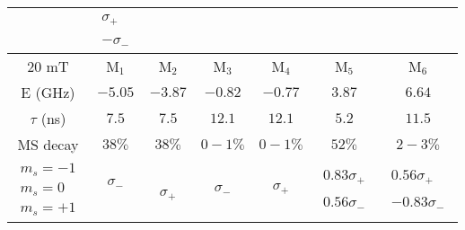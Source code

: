 \documentclass[aps,pra,amsmath,amssymb,reprint,superscriptaddress,tightenlines]{revtex4-1}
\begin{document}
\begin{table}[tbht]
\begin{ruledtabular}
\begin{tabular}{c | c | c | c | c | c | c}
        & $\begin{matrix} \sigma_{+} \\ \: \\ -\sigma_{-} \end{matrix}$   \\
        \hline\hline
		20 mT & M$_{1}$ & M$_{2}$ & M$_{3}$ & M$_{4}$ & M$_{5}$ & M$_{6}$\\
		\hline
		E (GHz)  & $-5.05$ & $-3.87$ & $-0.82$ & $ -0.77$ & $3.87$ & $6.64$ \\
		$\tau$ (ns) & $7.5$ & $7.5$ & $12.1$ & $12.1$ & $5.2$ & $11.5$ \\
		MS decay & $38\%$ & $38\%$ & $0-1\%$ & $0-1\%$ & $52\%$ & $2-3\%$ \\		
		  $\begin{matrix} m_{s}=-1   \\ m_{s}=0 \\ m_{s}=+1 \end{matrix}$
		& $\begin{matrix} \sigma_{-} \\ \: \\ \: \end{matrix}$
		& $\begin{matrix} \: \\ \: \\ \sigma_{+} \end{matrix}$
		& $\begin{matrix} \: \\ \sigma_{-} \\ \: \end{matrix}$
		& $\begin{matrix} \: \\ \sigma_{+} \\ \: \end{matrix}$
		& $\begin{matrix} 0.83\sigma_{+} \\ \: \\ 0.56\sigma_{-} \end{matrix}$
		& $\begin{matrix}0.56 \sigma_{+} \\ \: \\ -0.83\sigma_{-} \end{matrix}$      
\end{tabular}
\end{ruledtabular}
\end{table}
\end{document}

